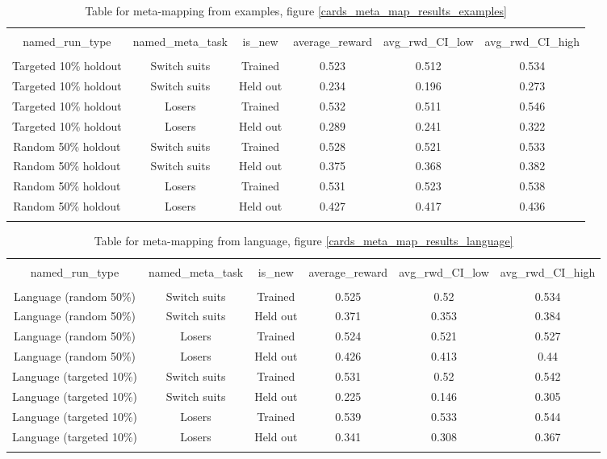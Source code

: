\begin{table}[H]
\scriptsize
\centering
\begin{tabular}{@{\extracolsep{5pt}} cccccc}
\\[-1.8ex]\hline
\hline \\[-1.8ex]
named\_run\_type & named\_meta\_task & is\_new & average\_reward & avg\_rwd\_CI\_low & avg\_rwd\_CI\_high \\
\hline \\[-1.8ex]
Targeted 10\% holdout & Switch suits & Trained & 0.523 & 0.512 & 0.534 \\
Targeted 10\% holdout & Switch suits & Held out & 0.234 & 0.196 & 0.273 \\
Targeted 10\% holdout & Losers & Trained & 0.532 & 0.511 & 0.546 \\
Targeted 10\% holdout & Losers & Held out & 0.289 & 0.241 & 0.322 \\
Random 50\% holdout & Switch suits & Trained & 0.528 & 0.521 & 0.533 \\
Random 50\% holdout & Switch suits & Held out & 0.375 & 0.368 & 0.382 \\
Random 50\% holdout & Losers & Trained & 0.531 & 0.523 & 0.538 \\
Random 50\% holdout & Losers & Held out & 0.427 & 0.417 & 0.436 \\
\hline \\[-1.8ex]
\end{tabular}
\caption{Table for meta-mapping from examples, figure \ref{cards_meta_map_results_examples}}
\end{table}

\begin{table}[H]
\scriptsize
\centering
\begin{tabular}{@{\extracolsep{5pt}} cccccc}
\\[-1.8ex]\hline
\hline \\[-1.8ex]
named\_run\_type & named\_meta\_task & is\_new & average\_reward & avg\_rwd\_CI\_low & avg\_rwd\_CI\_high \\
\hline \\[-1.8ex]
Language (random 50\%) & Switch suits & Trained & 0.525 & 0.52 & 0.534 \\
Language (random 50\%) & Switch suits & Held out & 0.371 & 0.353 & 0.384 \\
Language (random 50\%) & Losers & Trained & 0.524 & 0.521 & 0.527 \\
Language (random 50\%) & Losers & Held out & 0.426 & 0.413 & 0.44 \\
Language (targeted 10\%) & Switch suits & Trained & 0.531 & 0.52 & 0.542 \\
Language (targeted 10\%) & Switch suits & Held out & 0.225 & 0.146 & 0.305 \\
Language (targeted 10\%) & Losers & Trained & 0.539 & 0.533 & 0.544 \\
Language (targeted 10\%) & Losers & Held out & 0.341 & 0.308 & 0.367 \\
\hline \\[-1.8ex]
\end{tabular}
\caption{Table for meta-mapping from language, figure \ref{cards_meta_map_results_language}}
\end{table}

